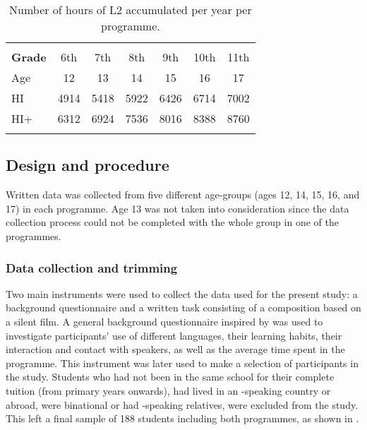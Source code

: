 \documentclass[output=paper]{langsci/langscibook}
\begin{document}
\begin{table}
\begin{tabularx}{\textwidth}{l SSSSSS} 
\lsptoprule
{}\\
\bfseries Grade & 6th & 7th & 8th & 9th & 10th & {11th}\\
\midrule 
 Age & {12} & 13 & 14 & 15 & 16 & 17\\
 HI & 4914 & 5418 & 5922 & 6426 & 6714 & {7002}\\
 HI+ & 6312 & 6924 & {7536} & {8016} & 8388 & 8760\\
\lspbottomrule
\end{tabularx} 
\caption{Number of hours of L2 accumulated per year per programme.}
\label{tab:tejada:2}
\end{table}

\subsection{Design and procedure}

Written data was collected from five different age-groups (ages 12, 14, 15, 16, and 17) in each programme. Age 13 was not taken into consideration since the data collection process could not be completed with the whole group in one of the programmes.

\subsubsection{Data collection and trimming}

Two main instruments were used to collect the data used for the present study: a  background questionnaire and a written task consisting of a composition based on a silent film.
A general  background questionnaire inspired by \citet{Grosjean2010} was used to investigate participants’ use of different languages, their learning habits, their  interaction and contact with  speakers, as well as the average time spent in the  programme. This instrument was later used to make a selection of participants in the study. Students who had not been in the same school for their complete tuition (from primary years onwards), had lived in an -speaking country or abroad, were binational or had -speaking relatives, were excluded from the study. This left a final sample of 188 students including both programmes, as shown in .
\end{document}
